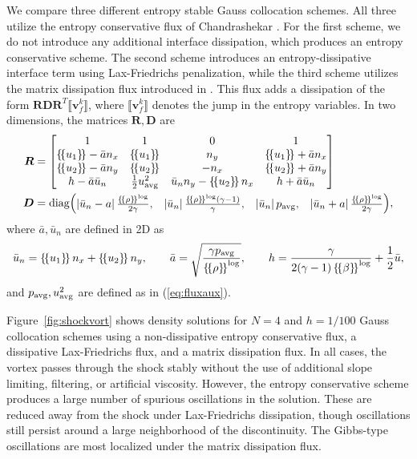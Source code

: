 \documentclass[review,onefignum,onetabnum,final]{siamart171218}
\newcommand{\LRb}[1]{\left| #1 \right|}
\newcommand{\LRc}[1]{\left\{ #1 \right\}}
\newcommand{\jump}[1] {\ensuremath{\llbracket#1\rrbracket}}
\newcommand{\avg}[1] {\ensuremath{\LRc{\!\{#1\}\!}}}
\begin{document}
We compare three different entropy stable Gauss collocation schemes.  All three utilize the entropy conservative flux of Chandrashekar \cite{chandrashekar2013kinetic}.  For the first scheme, we do not introduce any additional interface dissipation, which produces an entropy conservative scheme.  The second scheme introduces an entropy-dissipative interface term using Lax-Friedrichs penalization, while the third scheme utilizes the matrix dissipation flux introduced in \cite{winters2017uniquely}.  This flux adds a dissipation of the form $\bm{R}\bm{D}\bm{R}^T\jump{{\bm{v}}^k_f}$, where $\jump{{\bm{v}}^k_f}$ denotes the jump in the entropy variables.  In two dimensions, the matrices $\bm{R}, \bm{D}$ are 
\begin{align*}
\bm{R} &= \begin{bmatrix}
1 & 1 & 0 & 1\\
\avg{u_1}-\bar{a} n_x & \avg{u_1} & n_y & \avg{u_1}+\bar{a} n_x\\
\avg{u_2}-\bar{a} n_y & \avg{u_2} & -n_x & \avg{u_2}+\bar{a} n_y\\
h-\bar{a} \bar{u}_n & \frac{1}{2}u^2_{\rm avg} & \bar{u}_n n_y - \avg{u_2}n_x & h + \bar{a} \bar{u}_n
\end{bmatrix}\\
\bm{D} &= {\rm diag}{\begin{pmatrix}
\LRb{\bar{u}_n - a}\frac{\avg{\rho}^{\log}}{2\gamma}, & \LRb{\bar{u}_n}\frac{\avg{\rho}^{\log}(\gamma-1)}{\gamma}, & \LRb{\bar{u}_n}p_{\rm avg}, & \LRb{\bar{u}_n + a}\frac{\avg{\rho}^{\log}}{2\gamma} \end{pmatrix}},
\end{align*}
where $\bar{a}, \bar{u}_n$ are defined in 2D as
\begin{gather*}
\bar{u}_n = \avg{u_1}n_x + \avg{u_2}n_y, \qquad \bar{a} = \sqrt{\frac{\gamma p_{\rm avg}}{\avg{\rho}^{\log}}}, \qquad h = \frac{\gamma}{2(\gamma-1)\avg{\beta}^{\log}} + \frac{1}{2}\bar{u}, 
\end{gather*}
and $p_{\rm avg}, u^2_{\rm avg}$ are defined as in (\ref{eq:fluxaux}).  

Figure~\ref{fig:shockvort} shows density solutions for $N=4$ and $h = 1/100$ Gauss collocation schemes using a non-dissipative entropy conservative flux, a dissipative Lax-Friedrichs flux, and a matrix dissipation flux.  In all cases, the vortex passes through the shock stably without the use of additional slope limiting, filtering, or artificial viscosity.  However, the entropy conservative scheme produces a large number of spurious oscillations in the solution.  These are reduced away from the shock under Lax-Friedrichs dissipation, though oscillations still persist around a large neighborhood of the discontinuity.  The Gibbs-type oscillations are most localized under the matrix dissipation flux.  
\end{document}
